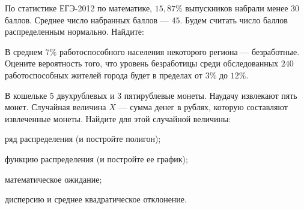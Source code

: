 \vfil

\begin{zkrPlain}{25}\noindent 
	По статистике ЕГЭ-2012 по математике, $15{,}87\%$ выпускников набрали менее $30$ баллов. Среднее число набранных баллов — $45$. Будем считать число баллов распределенным нормально. Найдите: \par {}
 
\end{zkrPlain}

\vfil

\begin{zkrPlain}{25}\noindent 
	В среднем $ 7 \% $ работоспособного населения некоторого региона --- безработные. Оцените вероятность того, что уровень безработицы среди обследованных $ 240 $ работоспособных жителей города будет в пределах от $ 3 \% $ до $ 12 \% $.
 
\end{zkrPlain}

\newpage\setcounter{zad}{0}\setcounter{footnote}{0}



\begin{zkrPlain}{25}\noindent 
	В кошельке 5 двухрублевых и 3 пятирублевые монеты. Наудачу извлекают пять монет. Случайная величина $X$ --- сумма денег в рублях, которую составляют извлеченные монеты.  Найдите для этой случайной величины: \par \smallskip\small{ \par \zz ряд распределения (и постройте полигон); \par \zz функцию распределения (и постройте ее график); \par \zz математическое ожидание; \par \zz дисперсию и среднее квадратическое отклонение.\par \par}
 
\end{zkrPlain}

\vfil

